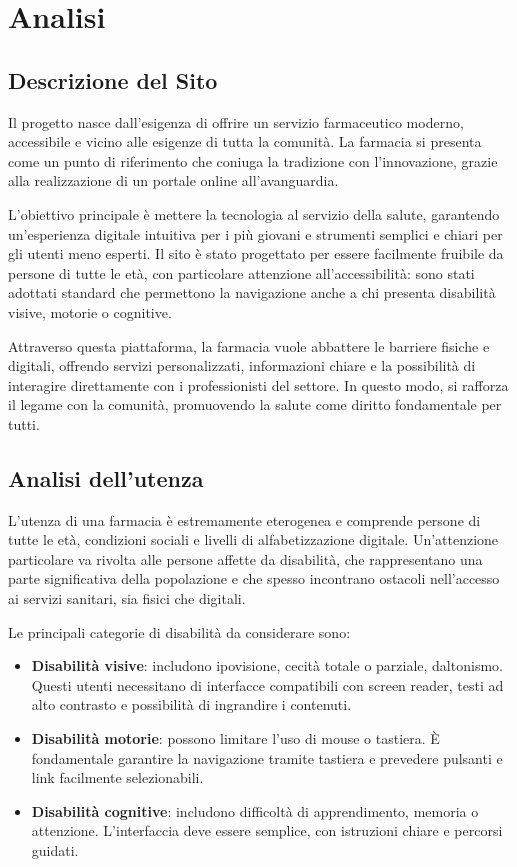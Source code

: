\section{Analisi}
\subsection{Descrizione del Sito}
Il progetto nasce dall'esigenza di offrire un servizio farmaceutico moderno, accessibile e vicino alle esigenze di tutta la comunità. La farmacia si presenta come un punto di riferimento che coniuga la tradizione con l'innovazione, grazie alla realizzazione di un portale online all'avanguardia.

L'obiettivo principale è mettere la tecnologia al servizio della salute, garantendo un'esperienza digitale intuitiva per i più giovani e strumenti semplici e chiari per gli utenti meno esperti. Il sito è stato progettato per essere facilmente fruibile da persone di tutte le età, con particolare attenzione all'accessibilità: sono stati adottati standard che permettono la navigazione anche a chi presenta disabilità visive, motorie o cognitive.

Attraverso questa piattaforma, la farmacia vuole abbattere le barriere fisiche e digitali, offrendo servizi personalizzati, informazioni chiare e la possibilità di interagire direttamente con i professionisti del settore. In questo modo, si rafforza il legame con la comunità, promuovendo la salute come diritto fondamentale per tutti.

\subsection{Analisi dell'utenza}

L'utenza di una farmacia è estremamente eterogenea e comprende persone di tutte le età, condizioni sociali e livelli di alfabetizzazione digitale. Un'attenzione particolare va rivolta alle persone affette da disabilità, che rappresentano una parte significativa della popolazione e che spesso incontrano ostacoli nell'accesso ai servizi sanitari, sia fisici che digitali.

Le principali categorie di disabilità da considerare sono:
\begin{itemize}
    \item \textbf{Disabilità visive}: includono ipovisione, cecità totale o parziale, daltonismo. Questi utenti necessitano di interfacce compatibili con screen reader, testi ad alto contrasto e possibilità di ingrandire i contenuti.
    \item \textbf{Disabilità motorie}: possono limitare l'uso di mouse o tastiera. È fondamentale garantire la navigazione tramite tastiera e prevedere pulsanti e link facilmente selezionabili.
    \item \textbf{Disabilità cognitive}: includono difficoltà di apprendimento, memoria o attenzione. L'interfaccia deve essere semplice, con istruzioni chiare e percorsi guidati.
\end{itemize}

